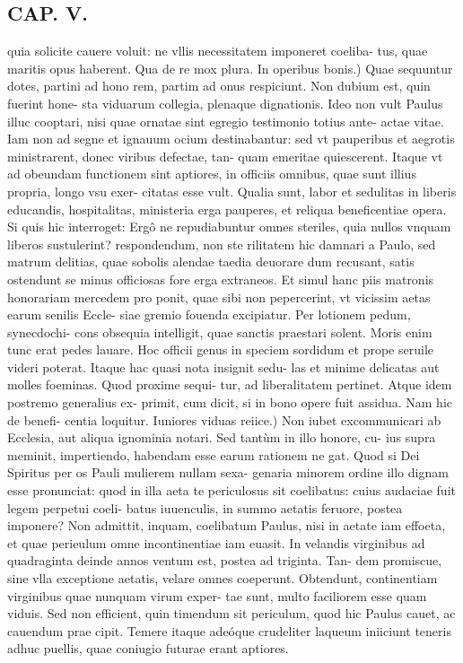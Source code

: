 \documentclass{article}
\begin{document}
\begin{pages}
\section*{CAP. V. }
\marginpar{[ p.61 ]}\pstart quia solicite cauere voluit: ne vllis necessitatem imponeret coeliba- tus, quae maritis opus haberent. Qua de re mox plura.  \pend\pstart In operibus bonis.) Quae sequuntur dotes, partini ad hono rem, partim ad onus respiciunt. Non dubium est, quin fuerint hone- sta viduarum collegia, plenaque dignationis. Ideo non vult Paulus illuc cooptari, nisi quae ornatae sint egregio testimonio totius ante- actae vitae. Iam non ad segne et ignauum ocium destinabantur: sed vt pauperibus et aegrotis ministrarent, donec viribus defectae, tan- quam emeritae quiescerent. Itaque vt ad obeundam functionem sint aptiores, in officiis omnibus, quae sunt illius propria, longo vsu exer- citatas esse vult. Qualia sunt, labor et sedulitas in liberis educandis, hospitalitas, ministeria erga pauperes, et reliqua beneficentiae opera. Si quis hic interroget: Ergô ne repudiabuntur omnes steriles, quia nullos vnquam liberos sustulerint? respondendum, non ste rilitatem hic damnari a Paulo, sed matrum delitias, quae sobolis alendae taedia deuorare dum recusant, satis ostendunt se minus officiosas fore erga extraneos. Et simul hanc piis matronis honorariam mercedem pro ponit, quae sibi non pepercerint, vt vicissim aetas earum senilis Eccle- siae gremio fouenda excipiatur. Per lotionem pedum, synecdochi- cons obsequia intelligit, quae sanctis praestari solent. Moris enim tunc erat pedes lauare. Hoc officii genus in speciem sordidum et prope seruile videri poterat. Itaque hac quasi nota insignit sedu- las et minime delicatas aut molles foeminas. Quod proxime sequi- tur, ad liberalitatem pertinet. Atque idem postremo generalius ex- primit, cum dicit, si in bono opere fuit assidua. Nam hic de benefi- centia loquitur.  \pend\pstart Iuniores viduas reiice.) Non iubet excommunicari ab Ecclesia, aut aliqua ignominia notari. Sed tantùm in illo honore, cu- ius supra meminit, impertiendo, habendam esse earum rationem ne gat. Quod si Dei Spiritus per os Pauli mulierem nullam sexa- genaria minorem ordine illo dignam esse pronunciat: quod in illa aeta te periculosus sit coelibatus: cuius audaciae fuit legem perpetui coeli- batus iuuenculis, in summo aetatis feruore, postea imponere? Non admittit, inquam, coelibatum Paulus, nisi in aetate iam effoeta, et quae perieulum omne incontinentiae iam euasit. In velandis virginibus ad quadraginta deinde annos ventum est, postea ad triginta. Tan- dem promiscue, sine vlla exceptione aetatis, velare omnes coeperunt. Obtendunt, continentiam virginibus quae nunquam virum exper- tae sunt, multo faciliorem esse quam viduis. Sed non efficient, quin timendum sit periculum, quod hic Paulus cauet, ac cauendum prae cipit. Temere itaque adeóque crudeliter laqueum iniiciunt teneris adhuc puellis, quae coniugio futurae erant aptiores.  \pend

\end{pages}
\end{document}
